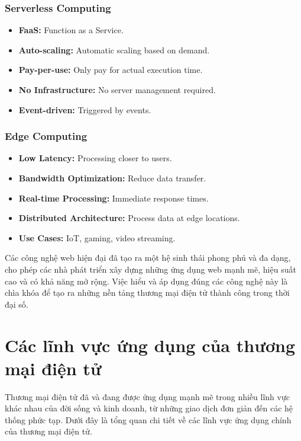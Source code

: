 \documentclass[a4paper,12pt]{report}
\begin{document}
\subsubsection{Serverless Computing}
\begin{itemize}
    \item \textbf{FaaS:} Function as a Service.
    \item \textbf{Auto-scaling:} Automatic scaling based on demand.
    \item \textbf{Pay-per-use:} Only pay for actual execution time.
    \item \textbf{No Infrastructure:} No server management required.
    \item \textbf{Event-driven:} Triggered by events.
\end{itemize}

\subsubsection{Edge Computing}
\begin{itemize}
    \item \textbf{Low Latency:} Processing closer to users.
    \item \textbf{Bandwidth Optimization:} Reduce data transfer.
    \item \textbf{Real-time Processing:} Immediate response times.
    \item \textbf{Distributed Architecture:} Process data at edge locations.
    \item \textbf{Use Cases:} IoT, gaming, video streaming.
\end{itemize}

Các công nghệ web hiện đại đã tạo ra một hệ sinh thái phong phú và đa dạng, cho phép các nhà phát triển xây dựng những ứng dụng web mạnh mẽ, hiệu suất cao và có khả năng mở rộng. Việc hiểu và áp dụng đúng các công nghệ này là chìa khóa để tạo ra những nền tảng thương mại điện tử thành công trong thời đại số.

\section{Các lĩnh vực ứng dụng của thương mại điện tử}

Thương mại điện tử đã và đang được ứng dụng mạnh mẽ trong nhiều lĩnh vực khác nhau của đời sống và kinh doanh, từ những giao dịch đơn giản đến các hệ thống phức tạp. Dưới đây là tổng quan chi tiết về các lĩnh vực ứng dụng chính của thương mại điện tử.
\end{document}
